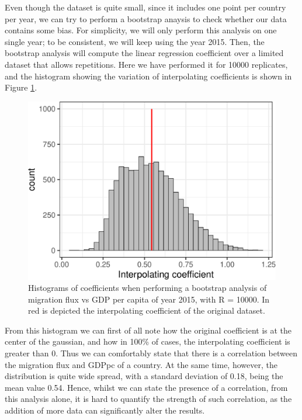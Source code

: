 \documentclass[
]{article}
\begin{document}
Even though the dataset is quite small, since it includes one point per
country per year, we can try to perform a bootstrap anaysis to check
whether our data contains some bias. For simplicity, we will only
perform this analysis on one single year; to be consistent, we will keep
using the year 2015. Then, the bootstrap analysis will compute the
linear regression coefficient over a limited dataset that allows
repetitions. Here we have performed it for 10000 replicates, and the
histogram showing the variation of interpolating coefficients is shown
in Figure \ref{fig:bootModel}.

\begin{figure}
\centering
\includegraphics{main_files/figure-latex/bootModel-1.pdf}
\caption{Histograms of coefficients when performing a bootstrap analysis
of migration flux vs GDP per capita of year 2015, with R = 10000. In red
is depicted the interpolating coefficient of the original dataset.
\label{fig:bootModel}}
\end{figure}

From this histogram we can first of all note how the original
coefficient is at the center of the gaussian, and how in 100\% of cases,
the interpolating coefficient is greater than 0. Thus we can comfortably
state that there is a correlation between the migration flux and GDPpc
of a country. At the same time, however, the distribution is quite wide
spread, with a standard deviation of 0.18, being the mean value 0.54.
Hence, whilst we can state the presence of a correlation, from this
analysis alone, it is hard to quantify the strength of such correlation,
as the addition of more data can significantly alter the results.
\end{document}
